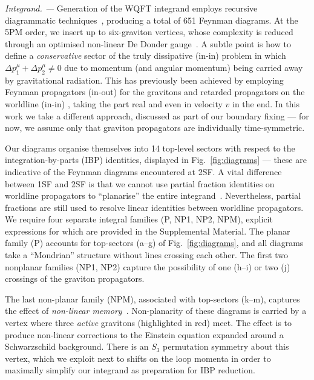 \documentclass[twocolumn,superscriptaddress,amsmath, amssymb, amsfonts,preprintnumbers,aps,prd,longbibliography,nofootinbib]{revtex4-2}
\renewcommand{\sec}[1]{\textit{#1. --- }}
\begin{document}
\sec{Integrand}
Generation of the WQFT integrand employs recursive diagrammatic techniques~\cite{Jakobsen:2022fcj, Jakobsen:2022psy, Jakobsen:2022zsx, Jakobsen:2023oow, Jakobsen:2023ndj, Jakobsen:2023hig, Driesse:2024xad, Driesse:2024feo},
producing a total of {651} Feynman diagrams.
At the 5PM order, we insert up to six-graviton vertices, whose complexity
is reduced
through an optimised non-linear De Donder gauge~\cite{Driesse:2024feo}.
A subtle point is how to define a \emph{conservative} sector of the truly dissipative
(in-in) problem in which $\Delta p_{1}^{\mu} + \Delta p_{2}^{\mu}\neq 0$ due to momentum
(and angular momentum) being carried away by gravitational radiation.
This {has previously been} achieved \cite{Kalin:2020fhe, Kalin:2020lmz, Dlapa:2021vgp, Jakobsen:2022fcj, Jakobsen:2023ndj, Jakobsen:2023pvx, Driesse:2024xad} by employing Feynman propagators  (in-out) for the gravitons
and retarded propagators on the worldline (in-in) \cite{Jakobsen:2022psy, Kalin:2022hph}, taking the part real and even in velocity $v$ in the end.
{In this work we take a different approach, discussed as part of our boundary fixing ---
for now, we assume only that graviton propagators are individually time-symmetric.}




Our diagrams organise themselves into 14 top-level sectors with respect to the integration-by-parts (IBP) identities, displayed in Fig.~\ref{fig:diagrams} --- these are indicative of the Feynman diagrams encountered at 2SF.
A vital difference between 1SF and 2SF is that we cannot use partial fraction identities on worldline propagators to ``planarise'' the entire integrand~\cite{Driesse:2024xad}.
Nevertheless, partial fractions are still used to resolve linear identities between worldline propagators.
We require four separate integral families {(P, NP1, NP2, NPM)}, explicit expressions for which are provided in the Supplemental Material.
The planar family (P) accounts for top-sectors (a--g) of Fig.~\ref{fig:diagrams},
{and all diagrams take a ``Mondrian'' structure without lines crossing each other.
The first two nonplanar families (NP1, NP2)} capture the possibility of one
(h--i) or two (j) crossings of the graviton propagators.

{The last non-planar family (NPM),}
associated with top-sectors (k--m), captures the effect of \emph{non-linear memory}~\cite{PhysRevD.46.4304, Porto:2024cwd, Cunningham:2024dog, Georgoudis:2025vkk}.
Non-planarity of these diagrams is carried by a vertex where three \emph{active} gravitons (highlighted in red) meet.
The effect is to produce non-linear corrections to the Einstein equation expanded around a Schwarzschild background.
There is an $S_{3}$ permutation symmetry about this vertex, which we exploit next to
shifts on the loop momenta in order to maximally simplify our integrand as preparation for IBP reduction.
\end{document}
